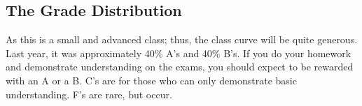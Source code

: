 
\subsection*{The Grade Distribution}

As this is a small and advanced class; thus, the class curve will be quite generous. Last year, it was approximately 40\% A's and 40\% B's. If you do your homework and demonstrate understanding on the exams, you should expect to be rewarded with an A or a B. C's are for those who can only demonstrate basic understanding. F's are rare, but occur.
